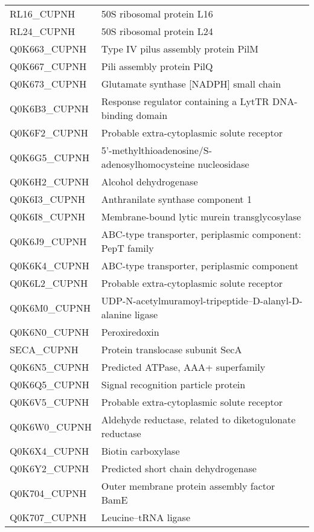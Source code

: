 \begin{center}
\begin{longtable}{ l l }
RL16\_CUPNH & 50S ribosomal protein L16 \\ [0.5ex]
RL24\_CUPNH & 50S ribosomal protein L24 \\ [0.5ex]
Q0K663\_CUPNH & Type IV pilus assembly protein PilM \\ [0.5ex]
Q0K667\_CUPNH & Pili assembly protein PilQ \\ [0.5ex]
Q0K673\_CUPNH & Glutamate synthase [NADPH] small chain \\ [0.5ex]
Q0K6B3\_CUPNH & Response regulator containing a LytTR DNA-binding domain \\ [0.5ex]
Q0K6F2\_CUPNH & Probable extra-cytoplasmic solute receptor \\ [0.5ex]
Q0K6G5\_CUPNH & 5'-methylthioadenosine/S-adenosylhomocysteine nucleosidase \\ [0.5ex]
Q0K6H2\_CUPNH & Alcohol dehydrogenase \\ [0.5ex]
Q0K6I3\_CUPNH & Anthranilate synthase component 1 \\ [0.5ex]
Q0K6I8\_CUPNH & Membrane-bound lytic murein transglycosylase \\ [0.5ex]
Q0K6J9\_CUPNH & ABC-type transporter, periplasmic component: PepT family \\ [0.5ex]
Q0K6K4\_CUPNH & ABC-type transporter, periplasmic component \\ [0.5ex]
Q0K6L2\_CUPNH & Probable extra-cytoplasmic solute receptor \\ [0.5ex]
Q0K6M0\_CUPNH & UDP-N-acetylmuramoyl-tripeptide--D-alanyl-D-alanine ligase \\ [0.5ex]
Q0K6N0\_CUPNH & Peroxiredoxin \\ [0.5ex]
SECA\_CUPNH & Protein translocase subunit SecA \\ [0.5ex]
Q0K6N5\_CUPNH & Predicted ATPase, AAA+ superfamily \\ [0.5ex]
Q0K6Q5\_CUPNH & Signal recognition particle protein \\ [0.5ex]
Q0K6V5\_CUPNH & Probable extra-cytoplasmic solute receptor \\ [0.5ex]
Q0K6W0\_CUPNH & Aldehyde reductase, related to diketogulonate reductase \\ [0.5ex]
Q0K6X4\_CUPNH & Biotin carboxylase \\ [0.5ex]
Q0K6Y2\_CUPNH & Predicted short chain dehydrogenase \\ [0.5ex]
Q0K704\_CUPNH & Outer membrane protein assembly factor BamE \\ [0.5ex]
Q0K707\_CUPNH & Leucine--tRNA ligase \\ [0.5ex]

\end{longtable}
\end{center}
